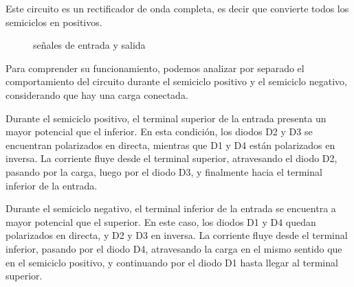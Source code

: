 Este circuito es un rectificador de onda completa, es decir que convierte todos los semiciclos en positivos.

\begin{figure}[h]
  \begin{minipage}[t][5cm][c]{0.5 \textwidth}
    \centering
  \end{minipage}
  \begin{minipage}[t][5cm][c]{0.5 \textwidth}
    \centering
  \end{minipage}
  \caption{señales de entrada y salida}
\end{figure}

Para comprender su funcionamiento, podemos analizar por separado el comportamiento del circuito durante el semiciclo positivo y el
semiciclo negativo, considerando que hay una carga conectada.

Durante el semiciclo positivo, el terminal superior de la entrada presenta un mayor potencial que el inferior. En esta condición, los diodos
D2 y D3 se encuentran polarizados en directa, mientras que D1 y D4 están polarizados en inversa. La corriente fluye desde el terminal
superior, atravesando el diodo D2, pasando por la carga, luego por el diodo D3, y finalmente hacia el terminal inferior de la entrada.

Durante el semiciclo negativo, el terminal inferior de la entrada se encuentra a mayor potencial que el superior. En este caso, los diodos
D1 y D4 quedan polarizados en directa, y D2 y D3 en inversa. La corriente fluye desde el terminal inferior, pasando por el diodo D4,
atravesando la carga en el mismo sentido que en el semiciclo positivo, y continuando por el diodo D1 hasta llegar al terminal superior.

